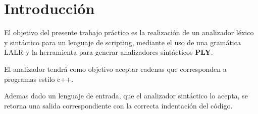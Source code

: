 \section{Introducción}
El objetivo del presente trabajo práctico es la realización de un analizador léxico y sintáctico para un lenguaje de scripting, mediante el uso de una gramática LALR y la herramienta para generar analizadores sintácticos \textbf{PLY}.

El analizador tendrá como objetivo aceptar cadenas que corresponden a programas estilo c++.

Ademas dado un lenguaje de entrada, que el analizador sintáctico lo acepta, se retorna una salida correspondiente con la correcta indentación del código.

